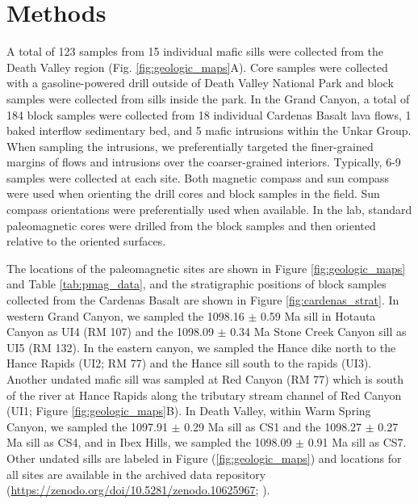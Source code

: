 \section*{Methods}

A total of 123 samples from 15 individual mafic sills were collected from the Death Valley region (Fig. \ref{fig:geologic_maps}A). Core samples were collected with a gasoline-powered drill outside of Death Valley National Park and block samples were collected from sills inside the park. In the Grand Canyon, a total of 184 block samples were collected from 18 individual Cardenas Basalt lava flows, 1 baked interflow sedimentary bed, and 5 mafic intrusions within the Unkar Group. When sampling the intrusions, we preferentially targeted the finer-grained margins of flows and intrusions over the coarser-grained interiors. Typically, 6-9 samples were collected at each site. Both magnetic compass and sun compass were used when orienting the drill cores and block samples in the field. Sun compass orientations were preferentially used when available. In the lab, standard paleomagnetic cores were drilled from the block samples and then oriented relative to the oriented surfaces.

The locations of the paleomagnetic sites are shown in Figure \ref{fig:geologic_maps} and Table \ref{tab:pmag_data}, and the stratigraphic positions of block samples collected from the Cardenas Basalt are shown in Figure \ref{fig:cardenas_strat}. In western Grand Canyon, we sampled the 1098.16 $\pm$ 0.59 Ma sill in Hotauta Canyon as UI4 (RM 107) and the 1098.09 $\pm$ 0.34 Ma Stone Creek Canyon sill as UI5 (RM 132). In the eastern canyon, we sampled the Hance dike north to the Hance Rapids (UI2; RM 77) and the Hance sill south to the rapids (UI3). Another undated mafic sill was sampled at Red Canyon (RM 77) which is south of the river at Hance Rapids along the tributary stream channel of Red Canyon (UI1; Figure \ref{fig:geologic_maps}B). In Death Valley, within Warm Spring Canyon, we sampled the 1097.91 $\pm$ 0.29 Ma sill as CS1 and the 1098.27 $\pm$ 0.27 Ma sill as CS4, and in Ibex Hills, we sampled the 1098.09 $\pm$ 0.91 Ma sill as CS7. Other undated sills are labeled in Figure (\ref{fig:geologic_maps}) and locations for all sites are available in the archived data repository (\url{https://zenodo.org/doi/10.5281/zenodo.10625967}; \cite{Zhang2024a}). 

